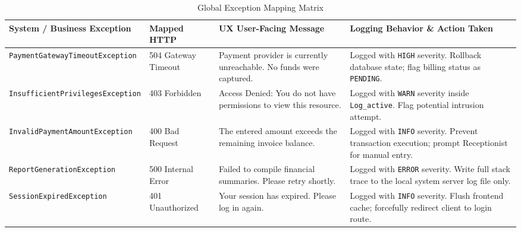 \begin{table}[htbp]
	\centering
	\small
	\caption{Global Exception Mapping Matrix}
	\label{tab:exception_matrix}
	\begin{tabular}{|p{4.2cm}|p{2.5cm}|p{3.8cm}|p{4.2cm}|}
		\hline
		\textbf{System / Business Exception} & \textbf{Mapped HTTP} & \textbf{UX User-Facing Message} & \textbf{Logging Behavior \& Action Taken} \\ \hline
		\texttt{PaymentGatewayTimeout\-Exception} & 504 Gateway Timeout & Payment provider is currently unreachable. No funds were captured. & Logged with \texttt{HIGH} severity. Rollback database state; flag billing status as \texttt{PENDING}. \\ \hline
		\texttt{InsufficientPrivileges\-Exception} & 403 Forbidden & Access Denied: You do not have permissions to view this resource. & Logged with \texttt{WARN} severity inside \texttt{Log\_active}. Flag potential intrusion attempt. \\ \hline
		\texttt{InvalidPaymentAmount\-Exception} & 400 Bad Request & The entered amount exceeds the remaining invoice balance. & Logged with \texttt{INFO} severity. Prevent transaction execution; prompt Receptionist for manual entry. \\ \hline
		\texttt{ReportGeneration\-Exception} & 500 Internal Error & Failed to compile financial summaries. Please retry shortly. & Logged with \texttt{ERROR} severity. Write full stack trace to the local system server log file only. \\ \hline
		\texttt{SessionExpired\-Exception} & 401 Unauthorized & Your session has expired. Please log in again. & Logged with \texttt{INFO} severity. Flush frontend cache; forcefully redirect client to login route. \\ \hline
	\end{tabular}
\end{table}